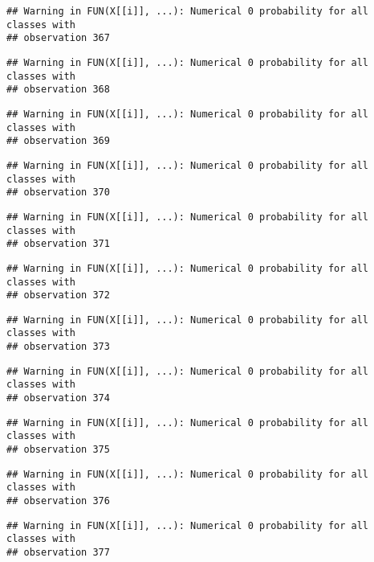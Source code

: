 \documentclass[
]{article}
\begin{document}
\begin{verbatim}
## Warning in FUN(X[[i]], ...): Numerical 0 probability for all classes with
## observation 367
\end{verbatim}

\begin{verbatim}
## Warning in FUN(X[[i]], ...): Numerical 0 probability for all classes with
## observation 368
\end{verbatim}

\begin{verbatim}
## Warning in FUN(X[[i]], ...): Numerical 0 probability for all classes with
## observation 369
\end{verbatim}

\begin{verbatim}
## Warning in FUN(X[[i]], ...): Numerical 0 probability for all classes with
## observation 370
\end{verbatim}

\begin{verbatim}
## Warning in FUN(X[[i]], ...): Numerical 0 probability for all classes with
## observation 371
\end{verbatim}

\begin{verbatim}
## Warning in FUN(X[[i]], ...): Numerical 0 probability for all classes with
## observation 372
\end{verbatim}

\begin{verbatim}
## Warning in FUN(X[[i]], ...): Numerical 0 probability for all classes with
## observation 373
\end{verbatim}

\begin{verbatim}
## Warning in FUN(X[[i]], ...): Numerical 0 probability for all classes with
## observation 374
\end{verbatim}

\begin{verbatim}
## Warning in FUN(X[[i]], ...): Numerical 0 probability for all classes with
## observation 375
\end{verbatim}

\begin{verbatim}
## Warning in FUN(X[[i]], ...): Numerical 0 probability for all classes with
## observation 376
\end{verbatim}

\begin{verbatim}
## Warning in FUN(X[[i]], ...): Numerical 0 probability for all classes with
## observation 377
\end{verbatim}
\end{document}
